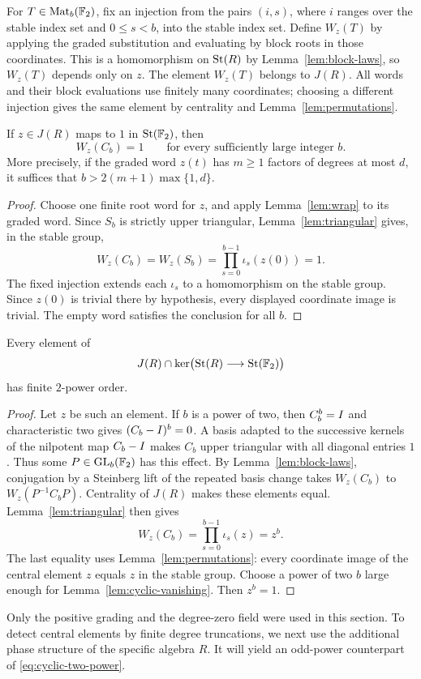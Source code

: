 For $T\in\operatorname{Mat}_b(\mathbb F_2)$, fix an injection from the pairs $(i,s)$,
where $i$ ranges over the stable index set and $0\leq s<b$,
into the stable index set.  Define $W_z(T)$ by applying the
graded substitution and evaluating by block roots in those
coordinates.  This is a homomorphism on $\operatorname{St}(R)$ by
Lemma~\ref{lem:block-laws}, so $W_z(T)$ depends only on $z$.
The element $W_z(T)$ belongs to $J(R)$.  All words and their
block evaluations use finitely many coordinates; choosing a
different injection gives the same element by centrality and
Lemma~\ref{lem:permutations}.

\begin{lemma}\label{lem:cyclic-vanishing}
If $z\in J(R)$ maps to $1$ in $\operatorname{St}(\mathbb F_2)$, then
\[
 W_z(C_b)=1
 \qquad\text{for every sufficiently large integer }b.
\]
More precisely, if the graded word $z(t)$ has $m\geq1$ factors
of degrees at most $d$, it suffices that
$b>2(m+1)\max\{1,d\}$.
\end{lemma}

\begin{proof}
Choose one finite root word for $z$, and apply
Lemma~\ref{lem:wrap} to its graded word.  Since $S_b$ is strictly
upper triangular, Lemma~\ref{lem:triangular} gives, in the stable
group,
\[
 W_z(C_b)=W_z(S_b)
       =\prod_{s=0}^{b-1}\iota_s(z(0))=1.
\]
The fixed injection extends each $\iota_s$ to a homomorphism on
the stable group.  Since $z(0)$ is trivial there by hypothesis,
every displayed coordinate image is trivial.  The empty word
satisfies the conclusion for all $b$.
\end{proof}

\begin{proposition}\label{prop:relative-torsion}
Every element of
\[
 J(R)\cap\ker\bigl(\operatorname{St}(R)\longrightarrow\operatorname{St}(\mathbb F_2)\bigr)
\]
has finite $2$-power order.
\end{proposition}

\begin{proof}
Let $z$ be such an element.  If $b$ is a power of two, then
$C_b^b=I$ and characteristic two gives
$(C_b-I)^b=0$.  A basis adapted to the successive kernels of
the nilpotent map $C_b-I$ makes $C_b$ upper triangular with
all diagonal entries $1$.  Thus some
$P\in\operatorname{GL}_b(\mathbb F_2)$ has this effect.  By
Lemma~\ref{lem:block-laws}, conjugation by a Steinberg lift of
the repeated basis change takes $W_z(C_b)$ to
$W_z(P^{-1}C_bP)$.  Centrality of $J(R)$ makes these elements
equal.  Lemma~\ref{lem:triangular} then gives
\begin{equation}\label{eq:cyclic-two-power}
 W_z(C_b)=\prod_{s=0}^{b-1}\iota_s(z)=z^b.
\end{equation}
The last equality uses Lemma~\ref{lem:permutations}: every
coordinate image of the central element $z$ equals $z$ in the
stable group.  Choose a power of two $b$ large enough for
Lemma~\ref{lem:cyclic-vanishing}.  Then $z^b=1$.
\end{proof}

Only the positive grading and the degree-zero field were used
in this section.  To detect central elements by finite degree
truncations, we next use the additional phase structure of the
specific algebra $R$.  It will yield an odd-power counterpart
of \eqref{eq:cyclic-two-power}.
